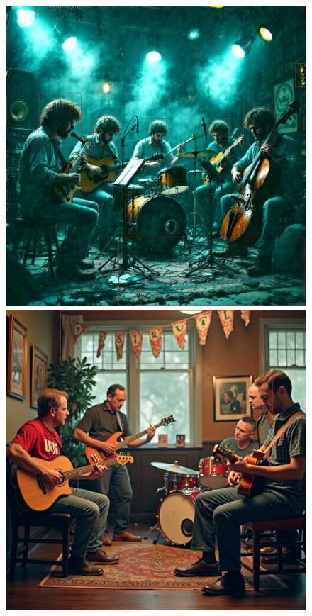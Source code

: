 \begin{figure}
    \begin{minipage}{0.24\textwidth}
        \centering
        \includegraphics[width=\textwidth]{bilder/HiDream-I1-Full_prompt-0_guidance-7.0_steps-50.png}
    \end{minipage}
    \begin{minipage}{0.24\textwidth}
        \centering
        \includegraphics[width=\textwidth]{bilder/FLUX-1-dev_prompt-0_guidance-3.5_steps-50.png}

\end{minipage}
\end{figure}
